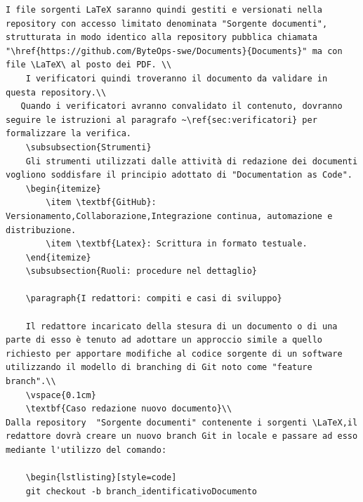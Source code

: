\documentclass{article}
\begin{document}
\begin{enumerate}
\begin{lstlisting}[style=code]
    I file sorgenti LaTeX saranno quindi gestiti e versionati nella repository con accesso limitato denominata "Sorgente documenti", strutturata in modo identico alla repository pubblica chiamata "\href{https://github.com/ByteOps-swe/Documents}{Documents}" ma con file \LaTeX\ al posto dei PDF. \\
    I verificatori quindi troveranno il documento da validare in questa repository.\\
   Quando i verificatori avranno convalidato il contenuto, dovranno seguire le istruzioni al paragrafo ~\ref{sec:verificatori} per formalizzare la verifica.
    \subsubsection{Strumenti}
    Gli strumenti utilizzati dalle attività di redazione dei documenti vogliono soddisfare il principio adottato di "Documentation as Code".
    \begin{itemize}
        \item \textbf{GitHub}: Versionamento,Collaborazione,Integrazione continua, automazione e distribuzione.
        \item \textbf{Latex}: Scrittura in formato testuale.
    \end{itemize}
    \subsubsection{Ruoli: procedure nel dettaglio}

    \paragraph{I redattori: compiti e casi di sviluppo}

    Il redattore incaricato della stesura di un documento o di una parte di esso è tenuto ad adottare un approccio simile a quello richiesto per apportare modifiche al codice sorgente di un software utilizzando il modello di branching di Git noto come "feature branch".\\
    \vspace{0.1cm}
    \textbf{Caso redazione nuovo documento}\\
Dalla repository  "Sorgente documenti" contenente i sorgenti \LaTeX,il redattore dovrà creare un nuovo branch Git in locale e passare ad esso mediante l'utilizzo del comando:

    \begin{lstlisting}[style=code]
    git checkout -b branch_identificativoDocumento 
    \end{lstlisting}


\end{enumerate}
\end{document}
